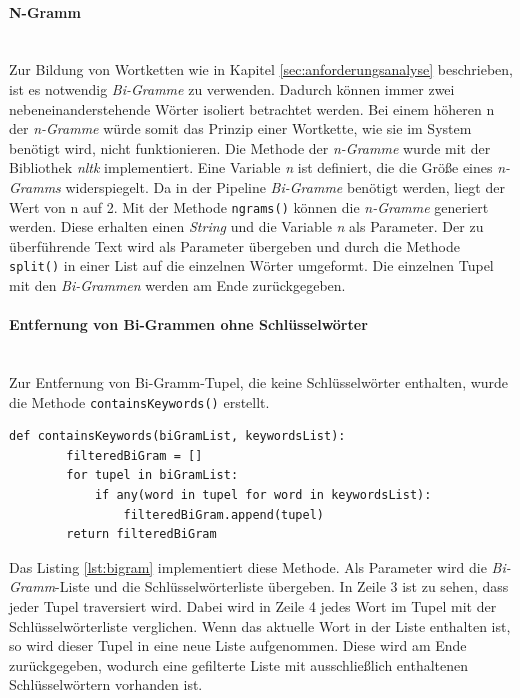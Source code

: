\paragraph{N-Gramm}\label{sec:ngram}\mbox{}\\
Zur Bildung von Wortketten wie in Kapitel \ref{sec:anforderungsanalyse} beschrieben, ist es notwendig \emph{Bi-Gramme} zu verwenden. Dadurch können immer zwei nebeneinanderstehende Wörter isoliert betrachtet werden. Bei einem höheren n der \emph{n-Gramme} würde somit das Prinzip einer Wortkette, wie sie im System benötigt wird, nicht funktionieren. Die Methode der \emph{n-Gramme} wurde mit der Bibliothek \emph{nltk} implementiert.
Eine Variable \emph{n} ist definiert, die die Größe eines \emph{n-Gramms} widerspiegelt. Da in der Pipeline \emph{Bi-Gramme} benötigt werden, liegt der Wert von n auf 2. Mit der Methode \lstinline{ngrams()}
können die \emph{n-Gramme} generiert werden. Diese erhalten einen \emph{String} und die Variable \emph{n} als Parameter. Der zu überführende Text wird als Parameter übergeben und durch die Methode \lstinline{split()}
in einer List auf die einzelnen Wörter umgeformt. Die einzelnen Tupel mit den \emph{Bi-Grammen} werden am Ende zurückgegeben.
\paragraph{Entfernung von Bi-Grammen ohne Schlüsselwörter}\mbox{}\\
Zur Entfernung von Bi-Gramm-Tupel, die keine Schlüsselwörter enthalten, wurde die Methode \lstinline{containsKeywords()} erstellt.
\begin{lstlisting}[caption={Implementation der Filterung für Schlüsselwörter in einer Bi-Gramm Liste}, label=lst:bigram]
	def containsKeywords(biGramList, keywordsList):
		filteredBiGram = []
		for tupel in biGramList:
			if any(word in tupel for word in keywordsList):
				filteredBiGram.append(tupel)
		return filteredBiGram
\end{lstlisting}
Das Listing \ref{lst:bigram} implementiert diese Methode. Als Parameter wird die \emph{Bi-Gramm}-Liste und die Schlüsselwörterliste übergeben. In Zeile 3 ist zu sehen, dass jeder Tupel traversiert wird. Dabei wird in Zeile 4 jedes Wort im Tupel mit der Schlüsselwörterliste verglichen. Wenn das aktuelle Wort in der Liste enthalten ist, so wird dieser Tupel in eine neue Liste aufgenommen. Diese wird am Ende zurückgegeben, wodurch eine gefilterte Liste mit ausschließlich enthaltenen Schlüsselwörtern vorhanden ist.
